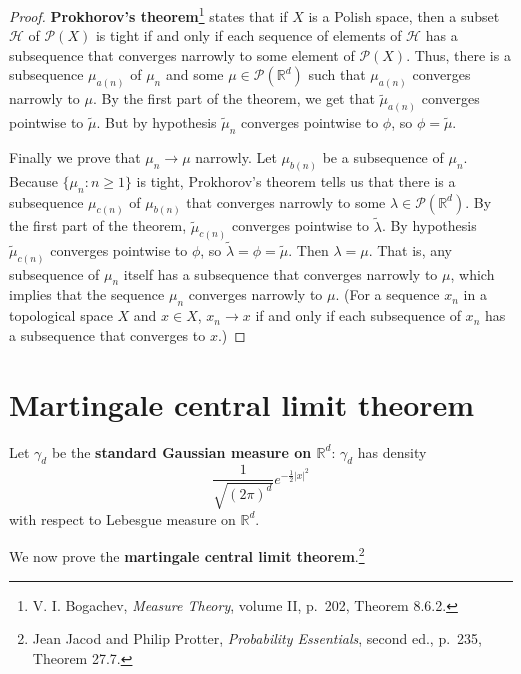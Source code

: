 \documentclass{article}
\theoremstyle{definition}
\begin{document}
\begin{proof}
\textbf{Prokhorov's theorem}\footnote{V. I. Bogachev,
{\em Measure Theory}, volume II, p.~202, Theorem 8.6.2.}
 states that if $X$ is a Polish space, then a subset $\mathscr{H}$
of $\mathscr{P}(X)$ is tight if and only if each sequence of elements of $\mathscr{H}$ has a subsequence that converges
narrowly to some element of $\mathscr{P}(X)$. 
Thus, there is a subsequence $\mu_{a(n)}$ of $\mu_n$ and some $\mu \in \mathscr{P}(\mathbb{R}^d)$ such that
$\mu_{a(n)}$ converges narrowly to $\mu$. 
By the first part of the theorem, we get that $\tilde{\mu}_{a(n)}$ converges pointwise to
$\tilde{\mu}$. 
But by hypothesis $\tilde{\mu}_n$ converges pointwise to $\phi$, so
$\phi=\tilde{\mu}$.

Finally we prove that $\mu_n \to \mu$ narrowly. Let $\mu_{b(n)}$ be a subsequence of $\mu_n$. Because $\{\mu_n: n \geq 1\}$ is tight,
Prokhorov's theorem tells us that there is a subsequence $\mu_{c(n)}$ of $\mu_{b(n)}$ that converges narrowly to some
$\lambda \in \mathscr{P}(\mathbb{R}^d)$. By the first part of the theorem, $\tilde{\mu}_{c(n)}$ converges pointwise to
$\tilde{\lambda}$. By hypothesis $\tilde{\mu}_{c(n)}$ converges pointwise to $\phi$, so
$\tilde{\lambda}=\phi=\tilde{\mu}$. Then
$\lambda = \mu$. That is, any subsequence of $\mu_n$ itself has a subsequence that converges narrowly to
$\mu$, which implies that the sequence
$\mu_n$ converges narrowly to $\mu$. (For a sequence $x_n$ in a topological space $X$ and $x \in X$, 
$x_n \to x$ if and only if each subsequence of $x_n$ has a subsequence that converges to $x$.)
\end{proof}


\section{Martingale central limit theorem}
Let $\gamma_d$ be the \textbf{standard Gaussian measure on $\mathbb{R}^d$}: $\gamma_d$ has density
\[
\frac{1}{\sqrt{(2\pi)^d}} e^{-\frac{1}{2}|x|^2}
\]
with respect to Lebesgue measure on $\mathbb{R}^d$. 

We now prove the \textbf{martingale central limit theorem}.\footnote{Jean Jacod and Philip Protter, {\em Probability Essentials}, second ed., p.~235, Theorem 27.7.}
\end{document}
